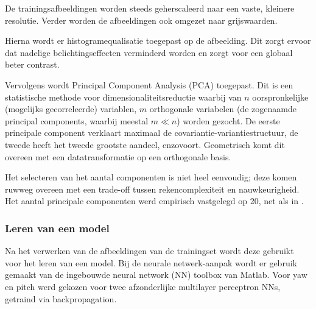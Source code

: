 \documentclass[a4paper,dutch,11pt]{scrartcl}
\begin{document}
De trainingsafbeeldingen worden steeds geherscaleerd naar een vaste, kleinere resolutie. 
Verder worden de afbeeldingen ook omgezet naar grijswaarden. %

Hierna wordt er histogramequalisatie toegepast op de afbeelding. Dit zorgt ervoor dat nadelige belichtingseffecten verminderd worden en zorgt voor een globaal beter contrast. 

Vervolgens wordt Principal Component Analysis (PCA) \cite{stat} toegepast. Dit is een statistische methode voor dimensionaliteitsreductie waarbij van $n$ oorspronkelijke (mogelijks gecorreleerde) variablen, $m$ orthogonale variabelen (de zogenaamde principal components, waarbij meestal $m\ll n$) worden gezocht. De eerste principale component verklaart maximaal de covariantie-variantiestructuur, de tweede heeft het tweede grootste aandeel, enzovoort. Geometrisch komt dit overeen met een datatransformatie op een orthogonale basis.

Het selecteren van het aantal componenten is niet heel eenvoudig; deze komen ruwweg overeen met een trade-off tussen rekencomplexiteit en nauwkeurigheid. Het aantal principale componenten werd empirisch vastgelegd op 20, net als in \cite{svmli}.




\subsubsection{Leren van een model}
Na het verwerken van de afbeeldingen van de trainingset wordt deze gebruikt voor het leren van een model.
Bij de neurale netwerk-aanpak wordt er gebruik gemaakt van de ingebouwde neural network (NN) toolbox van Matlab. 
Voor yaw en pitch werd gekozen voor twee afzonderlijke multilayer perceptron NNs, getraind via backpropagation.
\end{document}
